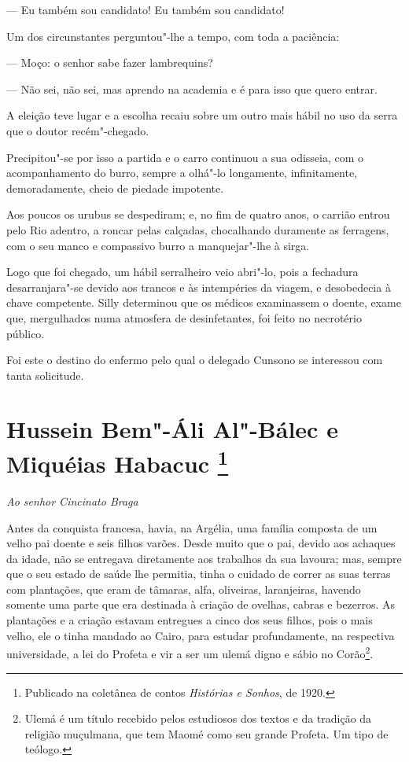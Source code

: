 --- Eu também sou candidato! Eu também sou candidato!

Um dos circunstantes perguntou"-lhe a tempo, com toda a paciência:

--- Moço: o senhor sabe fazer lambrequins?

--- Não sei, não sei, mas aprendo na academia e é para isso que quero
entrar.

A eleição teve lugar e a escolha recaiu sobre um outro mais hábil no uso
da serra que o doutor recém"-chegado.

Precipitou"-se por isso a partida e o carro continuou a sua odisseia, com
o acompanhamento do burro, sempre a olhá"-lo longamente, infinitamente,
demoradamente, cheio de piedade impotente.

Aos poucos os urubus se despediram; e, no fim de quatro anos, o carrião
entrou pelo Rio adentro, a roncar pelas calçadas, chocalhando duramente
as ferragens, com o seu manco e compassivo burro a manquejar"-lhe à
sirga.

Logo que foi chegado, um hábil serralheiro veio abri"-lo, pois a
fechadura desarranjara"-se devido aos trancos e às intempéries da viagem,
e desobedecia à chave competente. Silly determinou que os médicos
examinassem o doente, exame que, mergulhados numa atmosfera de
desinfetantes, foi feito no necrotério público.

Foi este o destino do enfermo pelo qual o delegado Cunsono se interessou
com tanta solicitude.


\chapter[Hussein Bem"-Áli Al"-Bálec e Miquéias Habacuc]{Hussein Bem"-Áli Al"-Bálec e Miquéias Habacuc \footnote[*]{Publicado na coletânea de contos \emph{Histórias e Sonhos}, de 1920.}}

\hfill\emph{Ao senhor Cincinato Braga}\bigskip

\noindent{}Antes da conquista francesa, havia, na Argélia, uma família composta de
um velho pai doente e seis filhos varões. Desde muito que o pai, devido
aos achaques da idade, não se entregava diretamente aos trabalhos da sua
lavoura; mas, sempre que o seu estado de saúde lhe permitia, tinha o
cuidado de correr as suas terras com plantações, que eram de tâmaras,
alfa, oliveiras, laranjeiras, havendo somente uma parte que era
destinada à criação de ovelhas, cabras e bezerros. As plantações e a
criação estavam entregues a cinco dos seus filhos, pois o mais velho,
ele o tinha mandado ao Cairo, para estudar profundamente, na respectiva
universidade, a lei do Profeta e vir a ser um ulemá digno e sábio no
Corão\footnote{Ulemá é um título recebido pelos estudiosos dos textos e
  da tradição da religião muçulmana, que tem Maomé como seu grande
  Profeta. Um tipo de teólogo.}.

